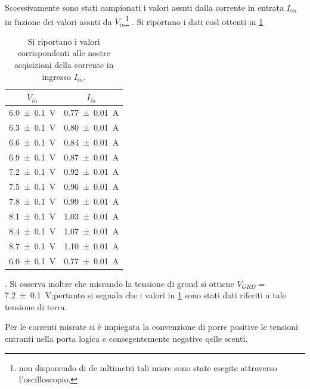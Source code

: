 	Sccessivamente sono stati campionati i valori assnti dalla corrente in entrata $I_{en}$ in fnzione dei valori assnti da $V_{in}$\footnote{non disponendo di de mltimetri tali misre sono state esegite attraverso l'oscilloscopio.} .
		Si riportano i dati così ottenti in \tablename{ \ref{t:2}}
	\begin{table}[hb]
		\centering
		\begin{tabular}{|c|c|}
			\toprule
			$V_{in}$  & 	$I_{in}$ \\
			\midrule
			\SI{6.0 \pm 0.1}{\volt} & \SI{0.77 \pm 0.01}{\ampere}\\
			\SI{6.3 \pm 0.1}{\volt} & \SI{0.80 \pm 0.01}{\ampere}\\
			\SI{6.6 \pm 0.1}{\volt} & \SI{0.84 \pm 0.01}{\ampere}\\
			\SI{6.9 \pm 0.1}{\volt} & \SI{0.87 \pm 0.01}{\ampere}\\
			\SI{7.2 \pm 0.1}{\volt} & \SI{0.92 \pm 0.01}{\ampere}\\
			\SI{7.5 \pm 0.1}{\volt} & \SI{0.96 \pm 0.01}{\ampere}\\
			\SI{7.8 \pm 0.1}{\volt} & \SI{0.99 \pm 0.01}{\ampere}\\
			\SI{8.1 \pm 0.1}{\volt} & \SI{1.03 \pm 0.01}{\ampere}\\
			\SI{8.4 \pm 0.1}{\volt} & \SI{1.07 \pm 0.01}{\ampere}\\
			\SI{8.7 \pm 0.1}{\volt} & \SI{1.10 \pm 0.01}{\ampere}\\
			\SI{6.0 \pm 0.1}{\volt} & \SI{0.77 \pm 0.01}{\ampere}\\
			\bottomrule
		\end{tabular}
		\caption{Si riportano i valori corrispondenti alle nostre acqisizioni della corrente in ingresso $I_{in}$.}
		\label{t:2}
	\end{table}
	.
	Si osserva inoltre che misrando la tensione di grond si ottiene $V_{GRD}=$	\SI{7.2 \pm 0.1}{\volt};pertanto si segnala che i valori in \tablename{ \ref{t:2}} sono stati dati riferiti a tale tensione di terra.
	
	Per le correnti misrate si è impiegata la convenzione di porre positive le tensioni entranti nella porta  logica e consegentemente negative qelle scenti.
	
